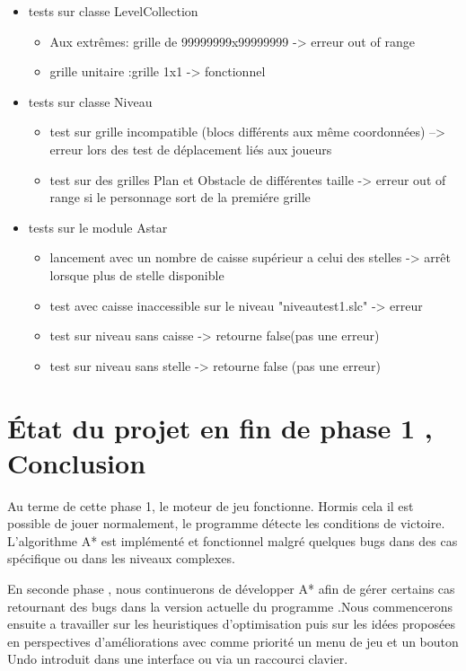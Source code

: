 \documentclass{article}
\begin{document}
	\begin{itemize}

	\item tests sur classe LevelCollection
		\begin{itemize}
		\item Aux extrêmes: grille de 99999999x99999999 -> erreur out of range
		\item grille unitaire :grille 1x1 -> fonctionnel
		\end{itemize}
		\vspace{0.5cm}
	\item tests sur classe Niveau
		\begin{itemize}
		\item test sur grille incompatible (blocs différents aux même coordonnées) --> erreur lors des test de déplacement liés aux joueurs
		\item test sur des grilles Plan et Obstacle de différentes taille -> erreur out of range si le personnage sort de la premiére grille
		\end{itemize}
		\vspace{0.5cm}
	\item tests sur le module Astar
		\begin{itemize}
		\item lancement avec un nombre de caisse supérieur a celui des stelles  -> arrêt lorsque plus de stelle disponible
		\item test avec caisse inaccessible sur le niveau "niveautest1.slc" -> erreur
		\item test sur niveau sans caisse -> retourne false(pas une erreur)
		\item test sur niveau sans stelle -> retourne false (pas une erreur) 
		\end{itemize}
	\end{itemize}
	
	
	
	
	

	
	\newpage
	
	\section{État du projet en fin de phase 1 , Conclusion}
	\vspace{1cm}
Au terme de cette phase 1, le moteur de jeu fonctionne. Hormis cela il est possible de jouer normalement, le programme détecte les conditions de victoire. L'algorithme A* est implémenté et fonctionnel malgré quelques bugs dans des cas spécifique ou dans les niveaux complexes.
\vspace{1cm}

 En seconde phase , nous continuerons de développer A* afin de gérer certains cas retournant des bugs dans la version actuelle du programme .Nous commencerons ensuite a travailler sur les heuristiques d'optimisation puis sur les idées proposées en perspectives d'améliorations avec comme priorité un menu de jeu et un bouton Undo introduit dans une interface ou via un raccourci clavier.





		
\end{document}

